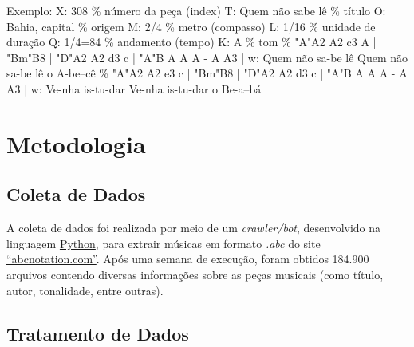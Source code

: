 \documentclass{automatextcc}
\begin{document}
\newpage
Exemplo: \newline
X: 308                  \% número da peça (index) \newline
T: Quem não sabe lê     \% título \newline
O: Bahia, capital       \% origem \newline
M: 2/4                  \% metro (compasso) \newline
L: 1/16                 \% unidade de duração \newline
Q: 1/4=84               \% andamento (tempo) \newline
K: A                    \% tom \newline
\% \newline
"A"A2 A2 c3 A | "Bm"B8 | "D"A2 A2 d3 c | "A"B A A A - A A3 | \newline 
w: Quem não sa-be lê Quem não sa-be lê o A-be--cê \newline
\% \newline
"A"A2 A2 e3 c | "Bm"B8 | "D"A2 A2 d3 c | "A"B A A A - A A3 | \newline
w: Ve-nha is-tu-dar Ve-nha is-tu-dar o Be-a--bá





\chapter{Metodologia}

\section{Coleta de Dados}

A coleta de dados foi realizada por meio de um \textit{crawler/bot}, desenvolvido na linguagem \href{https://python.org/}{Python}, para extrair músicas em formato \textit{.abc} do site \href{https://abcnotation.com/}{``abcnotation.com''}. Após uma semana de execução, foram obtidos 184.900 arquivos contendo diversas informações sobre as peças musicais (como título, autor, tonalidade, entre outras).

\section{Tratamento de Dados}
\end{document}
